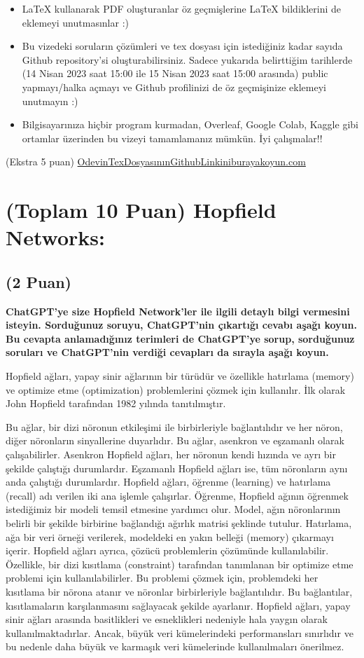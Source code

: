 \documentclass[11pt]{article}
\begin{document}
\begin{itemize}
    \item LaTeX kullanarak PDF oluşturanlar öz geçmişlerine LaTeX bildiklerini de eklemeyi unutmasınlar :)
    \item Bu vizedeki soruların çözümleri ve tex dosyası için istediğiniz kadar sayıda Github repository'si oluşturabilirsiniz. Sadece yukarıda belirttiğim tarihlerde (14 Nisan 2023 saat 15:00 ile 15 Nisan 2023 saat 15:00 arasında) public yapmayı/halka açmayı ve Github profilinizi de öz geçmişinize eklemeyi unutmayın :)
    \item Bilgisayarınıza hiçbir program kurmadan, Overleaf, Google Colab, Kaggle gibi ortamlar üzerinden bu vizeyi tamamlamanız mümkün. İyi çalışmalar!!
\end{itemize}

(Ekstra 5 puan) \url{OdevinTexDosyasınınGithubLinkiniburayakoyun.com}

\newpage
\section{(Toplam 10 Puan) Hopfield Networks:}

\subsection{(2 Puan)} \textbf{ChatGPT’ye size Hopfield Network’ler ile ilgili detaylı bilgi vermesini isteyin. Sorduğunuz soruyu, ChatGPT'nin çıkartığı cevabı aşağı koyun. Bu cevapta anlamadığınız terimleri de ChatGPT’ye sorup, sorduğunuz soruları ve ChatGPT’nin verdiği cevapları da sırayla aşağı koyun.}

Hopfield ağları, yapay sinir ağlarının bir türüdür ve özellikle hatırlama (memory) ve optimize etme (optimization) problemlerini çözmek için kullanılır. İlk olarak John Hopfield tarafından 1982 yılında tanıtılmıştır.

Bu ağlar, bir dizi nöronun etkileşimi ile birbirleriyle bağlantılıdır ve her nöron, diğer nöronların sinyallerine duyarlıdır. Bu ağlar, asenkron ve eşzamanlı olarak çalışabilirler. Asenkron Hopfield ağları, her nöronun kendi hızında ve ayrı bir şekilde çalıştığı durumlardır. Eşzamanlı Hopfield ağları ise, tüm nöronların aynı anda çalıştığı durumlardır. Hopfield ağları, öğrenme (learning) ve hatırlama (recall) adı verilen iki ana işlemle çalışırlar. Öğrenme, Hopfield ağının öğrenmek istediğimiz bir modeli temsil etmesine yardımcı olur. Model, ağın nöronlarının belirli bir şekilde birbirine bağlandığı ağırlık matrisi şeklinde tutulur. Hatırlama, ağa bir veri örneği verilerek, modeldeki en yakın belleği (memory) çıkarmayı içerir. Hopfield ağları ayrıca, çözücü problemlerin çözümünde kullanılabilir. Özellikle, bir dizi kısıtlama (constraint) tarafından tanımlanan bir optimize etme problemi için kullanılabilirler. Bu problemi çözmek için, problemdeki her kısıtlama bir nörona atanır ve nöronlar birbirleriyle bağlantılıdır. Bu bağlantılar, kısıtlamaların karşılanmasını sağlayacak şekilde ayarlanır. Hopfield ağları, yapay sinir ağları arasında basitlikleri ve esneklikleri nedeniyle hala yaygın olarak kullanılmaktadırlar. Ancak, büyük veri kümelerindeki performansları sınırlıdır ve bu nedenle daha büyük ve karmaşık veri kümelerinde kullanılmaları önerilmez.
\end{document}
